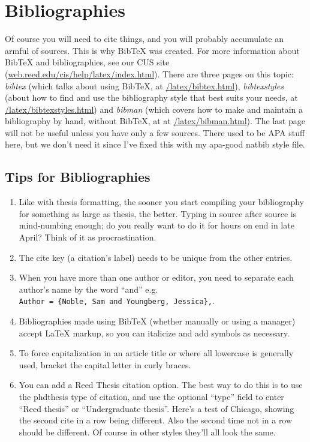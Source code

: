 \documentclass[12pt,twoside]{reedthesis}
\theoremstyle{plain}   %
\theoremstyle{definition}
\theoremstyle{remark}
\numberwithin{equation}{section}
\begin{document}
\section{Bibliographies}
	Of course you will need to cite things, and you will probably accumulate an armful of sources. This is why BibTeX was created. For more information about BibTeX and bibliographies, see our CUS site (\url{web.reed.edu/cis/help/latex/index.html}). There are three pages on this topic: {\it bibtex} (which talks about using BibTeX, at \url{/latex/bibtex.html}), {\it bibtexstyles} (about how to find and use the bibliography style that best suits your needs, at \url{/latex/bibtexstyles.html}) and {\it bibman} (which covers how to make and maintain a bibliography by hand, without BibTeX, at at \url{/latex/bibman.html}). The last page will not be useful unless you have only a few sources. There used to be APA stuff here, but we don't need it since I've fixed this with my apa-good natbib style file.
	
\subsection{Tips for Bibliographies}
\begin{enumerate}
\item Like with thesis formatting, the sooner you start compiling your bibliography for something as large as thesis, the better. Typing in source after source is mind-numbing enough; do you really want to do it for hours on end in late April? Think of it as procrastination.
\item The cite key (a citation's label) needs to be unique from the other entries.
\item When you have more than one author or editor, you need to separate each author's name by the word ``and'' e.g.\\ \verb+Author = {Noble, Sam and Youngberg, Jessica},+.
\item Bibliographies made using BibTeX (whether manually or using a manager) accept LaTeX markup, so you can italicize and add symbols as necessary.
\item To force capitalization in an article title or where all lowercase is generally used, bracket the capital letter in curly braces.
\item You can add a Reed Thesis citation option. The best way to do this is to use the phdthesis type of citation, and use the optional ``type'' field to enter ``Reed thesis'' or ``Undergraduate thesis''. Here's a test of Chicago, showing the second cite in a row being different. Also the second time not in a row should be different. Of course in other styles they'll all look the same.
\end{enumerate}
\end{document}
